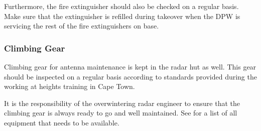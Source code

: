 \par
Furthermore, the fire extinguisher should also be checked on a regular basis. Make sure that the extinguisher is refilled during takeover when the DPW is servicing the rest of the fire extinguishers on base.

\clearpage

\subsubsection{Climbing Gear}
Climbing gear for antenna maintenance is kept in the radar hut as well. This gear should be inspected on a regular basis according to standards provided during the working at heights training in Cape Town.
\par
It is the responsibility of the overwintering radar engineer to ensure that the climbing gear is always ready to go and well maintained. See  for a list of all equipment that needs to be available.
\par

